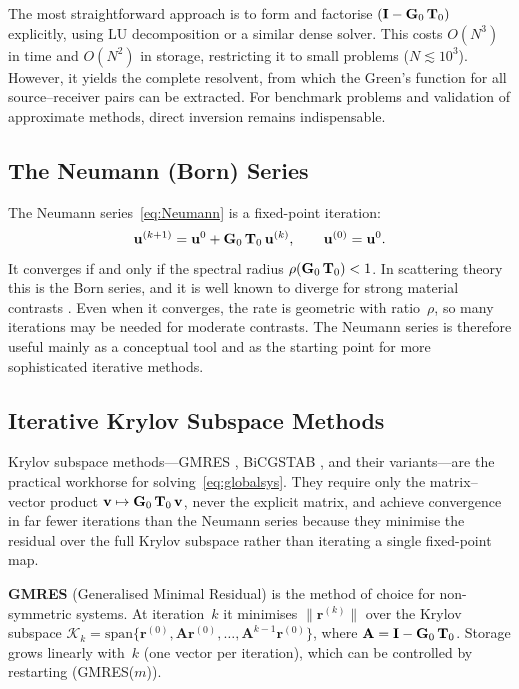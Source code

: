 The most straightforward approach is to form and factorise
$(\mathbf{I} - \mathbf{G}_0\,\mathbf{T}_0)$ explicitly, using LU decomposition or a similar
dense solver.  This costs $O(N^3)$ in time and $O(N^2)$ in storage,
restricting it to small problems ($N\lesssim 10^3$).  However, it yields
the complete resolvent, from which the Green's function for all
source--receiver pairs can be extracted.  For benchmark problems and
validation of approximate methods, direct inversion remains indispensable.

\subsection{The Neumann (Born) Series}

The Neumann series~\eqref{eq:Neumann} is a fixed-point iteration:
\begin{equation}
  \mathbf{u}^{(k+1)} = \mathbf{u}^0 + \mathbf{G}_0\,\mathbf{T}_0\,\mathbf{u}^{(k)}, \qquad
  \mathbf{u}^{(0)} = \mathbf{u}^0.
\label{eq:NeumannIter}
\end{equation}
It converges if and only if the spectral radius
$\rho(\mathbf{G}_0\,\mathbf{T}_0) < 1$.  In scattering theory this is the Born series,
and it is well known to diverge for strong material
contrasts \citep{Gubernatis1977}.  Even when it converges, the rate is
geometric with ratio~$\rho$, so many iterations may be needed for moderate
contrasts.  The Neumann series is therefore useful mainly as a conceptual
tool and as the starting point for more sophisticated iterative methods.

\subsection{Iterative Krylov Subspace Methods}

Krylov subspace methods---GMRES \citep{SaadSchultz1986},
BiCGSTAB \citep{vanderVorst1992}, and their variants---are the practical
workhorse for solving~\eqref{eq:globalsys}.  They require only the
matrix--vector product $\mathbf{v} \mapsto \mathbf{G}_0\,\mathbf{T}_0\,\mathbf{v}$, never the explicit
matrix, and achieve convergence in far fewer iterations than the Neumann
series because they minimise the residual over the full Krylov subspace
rather than iterating a single fixed-point map.

\textbf{GMRES} (Generalised Minimal Residual) \citep{SaadSchultz1986} is
the method of choice for non-symmetric systems.  At iteration~$k$ it
minimises $\|\mathbf{r}^{(k)}\|$ over the Krylov subspace
$\mathcal{K}_k = \mathrm{span}\{\mathbf{r}^{(0)},
\mathbf{A}\mathbf{r}^{(0)}, \ldots,
\mathbf{A}^{k-1}\mathbf{r}^{(0)}\}$, where
$\mathbf{A} = \mathbf{I} - \mathbf{G}_0\,\mathbf{T}_0$.  Storage grows linearly with~$k$
(one vector per iteration), which can be controlled by restarting
(GMRES($m$)).

